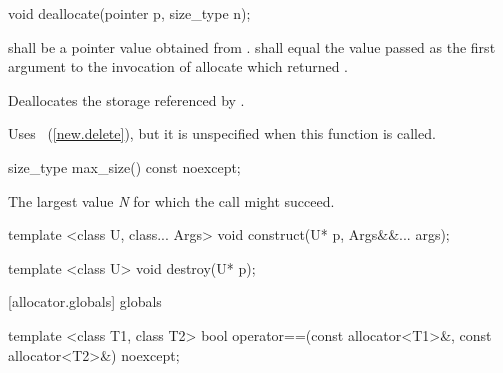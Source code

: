 \begin{itemdecl}
void deallocate(pointer p, size_type n);
\end{itemdecl}

\begin{itemdescr}
\pnum
\requires
{} shall be a pointer value obtained from .
 shall equal the value passed as the first argument
to the invocation of allocate which returned .

\pnum
\effects
Deallocates the storage referenced by  .

\pnum
\notes
Uses
~(\ref{new.delete}), but it is unspecified
when this function is called.
\end{itemdescr}

\begin{itemdecl}
size_type max_size() const noexcept;
\end{itemdecl}

\begin{itemdescr}
\pnum
\returns
The largest value \textit{N} for which the call 
might succeed.
\end{itemdescr}

%
\begin{itemdecl}
template <class U, class... Args>
  void construct(U* p, Args&&... args);
\end{itemdecl}

\begin{itemdescr}
\pnum
\effects
{}
\end{itemdescr}

%
\begin{itemdecl}
template <class U>
  void destroy(U* p);
\end{itemdecl}

\begin{itemdescr}
\pnum
\effects
{}
\end{itemdescr}

[allocator.globals]{ globals}

%
%
\begin{itemdecl}
template <class T1, class T2>
  bool operator==(const allocator<T1>&, const allocator<T2>&) noexcept;
\end{itemdecl}


